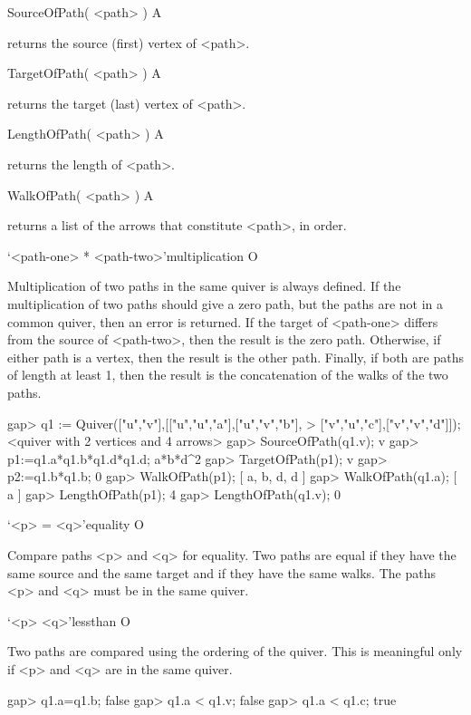 
\>SourceOfPath( <path> ) A

returns the source (first) vertex of <path>.

\>TargetOfPath( <path> ) A

returns the target (last) vertex of <path>.

\>LengthOfPath( <path> ) A

returns the length of <path>.

\>WalkOfPath( <path> ) A

returns a list of the arrows that constitute <path>,
in order.

\>`<path-one> * <path-two>'{multiplication} O

Multiplication of two paths in the same quiver is always defined.
If the multiplication of two paths should give a zero path,
but the paths are not in a common quiver,
then an error is returned.
If the target of <path-one> differs from the source of <path-two>,
then the result is the zero path.
Otherwise,
if either path is a vertex,
then the result is the other path.
Finally,
if both are paths of length at least 1,
then the result is the concatenation of the walks
of the two paths.

\beginexample
gap> q1 := Quiver(["u","v"],[["u","u","a"],["u","v","b"],
> ["v","u","c"],["v","v","d"]]);
<quiver with 2 vertices and 4 arrows>
gap> SourceOfPath(q1.v);                                                       
v
gap> p1:=q1.a*q1.b*q1.d*q1.d;
a*b*d^2
gap> TargetOfPath(p1);
v
gap> p2:=q1.b*q1.b;
0
gap> WalkOfPath(p1);
[ a, b, d, d ]
gap> WalkOfPath(q1.a);
[ a ]
gap> LengthOfPath(p1);
4
gap> LengthOfPath(q1.v);
0
\endexample

\>`<p> = <q>'{equality} O

Compare paths <p> and <q> for equality.
Two paths are equal if they have the same source
and the same target and if they have the same walks.
The paths <p> and <q> must be in the same quiver.


\>`<p> \< <q>'{lessthan} O

Two paths are compared using the ordering
of the quiver.
This is meaningful only if
<p> and <q> are in the same quiver.

\beginexample
gap> q1.a=q1.b;
false
gap> q1.a < q1.v;
false
gap> q1.a < q1.c;
true
\endexample


